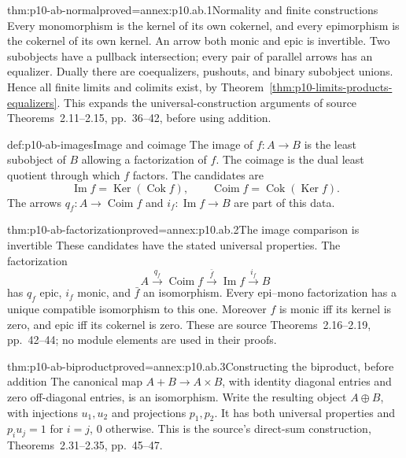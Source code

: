 \begin{hbtheorem}{thm:p10-ab-normal}{proved=annex:p10.ab.1}{Normality and finite constructions}
Every monomorphism is the kernel of its own cokernel, and every
epimorphism is the cokernel of its own kernel. An arrow both monic and
epic is invertible. Two subobjects have a pullback intersection;
every pair of parallel arrows has an equalizer. Dually there are
coequalizers, pushouts, and binary subobject unions. Hence all finite limits and colimits
exist, by Theorem~\ref{thm:p10-limits-products-equalizers}.
This expands the universal-construction arguments of source
Theorems~2.11--2.15, pp.~36--42, before using addition.
\end{hbtheorem}

\begin{hbdefinition}{def:p10-ab-images}{Image and coimage}
The image of \(f:A\to B\) is the least subobject of \(B\) allowing
a factorization of \(f\). The coimage is the dual least quotient
through which \(f\) factors. The candidates are
\[
 \operatorname{Im}f=\operatorname{Ker}(\operatorname{Cok}f),\qquad
 \operatorname{Coim}f=\operatorname{Cok}(\operatorname{Ker}f).
\]
The arrows \(q_f:A\to\operatorname{Coim}f\) and
\(i_f:\operatorname{Im}f\to B\) are part of this data.
\end{hbdefinition}

\begin{hbtheorem}{thm:p10-ab-factorization}{proved=annex:p10.ab.2}{The image comparison is invertible}
These candidates have the stated universal properties. The factorization
\[
 A\xrightarrow{q_f}\operatorname{Coim}f
 \xrightarrow{\bar f}\operatorname{Im}f\xrightarrow{i_f}B
\]
has \(q_f\) epic, \(i_f\) monic, and \(\bar f\) an isomorphism.
Every epi--mono factorization has a unique compatible isomorphism to
this one. Moreover \(f\) is monic iff its kernel is zero, and epic iff
its cokernel is zero. These are source Theorems~2.16--2.19,
pp.~42--44; no module elements are used in their proofs.
\end{hbtheorem}

\begin{hbtheorem}{thm:p10-ab-biproduct}{proved=annex:p10.ab.3}{Constructing the biproduct, before addition}
The canonical map \(A+B\to A\times B\), with identity diagonal
entries and zero off-diagonal entries, is an isomorphism. Write the
resulting object \(A\oplus B\), with injections \(u_1,u_2\) and
projections \(p_1,p_2\). It has both universal properties and
\(p_i u_j=1\) for \(i=j\), \(0\) otherwise. This is the source's
direct-sum construction, Theorems~2.31--2.35, pp.~45--47.
\end{hbtheorem}

